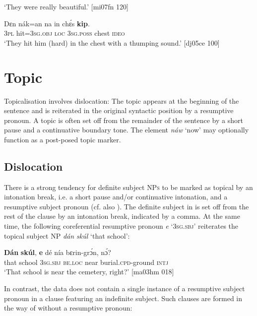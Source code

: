 \glt ‘They were really beautiful.’ [mi07fn 120]
\z


\ea%
    \label{ex:key:747}
    \gll Dɛn  nák=an    na  in    chɛ́s    \textbf{kip}.\\
\textsc{3pl}  hit=\textsc{3sg.obj}  \textsc{loc}  \textsc{3sg.poss}  chest  \textsc{ideo}\\

\glt ‘They hit him (hard) in the chest with a thumping sound.’ [dj05ce 100]
\z

\section{Topic}\label{sec:7.5}

Topicalisation involves dislocation: The topic appears at the beginning of the sentence and is reiterated in the original syntactic position by a resumptive pronoun. A topic is often set off from the remainder of the sentence by a short pause and a continuative boundary tone. The element \textit{náw} ‘now’ may optionally function as a post-posed topic marker.

\subsection{Dislocation}\label{sec:7.5.1}

There is a strong tendency for definite subject \textsc{NPs} to be marked as topical by an intonation break, i.e. a short pause and/or continuative intonation, and a resumptive subject pronoun (cf. also ). The definite subject in  is set off from the rest of the clause by an intonation break, indicated by a comma. At the same time, the following coreferential resumptive pronoun \textit{e} ‘\textsc{3sg.sbj}’ reiterates the topical subject \textsc{NP} \textit{dán skúl} ‘that school’:


\ea%
    \label{ex:key:748}
    \gll \textbf{Dán}    \textbf{skúl},  \textbf{e}    dé    nía    bɛrin-grɔ́n,    nɔ́?\\
that    school  \textsc{3sg.sbj}  \textsc{be.loc}  near    burial.\textsc{cpd}{}-ground  \textsc{intj}\\

\glt ‘That school is near the cemetery, right?’ [ma03hm 018]
\z

In contrast, the data does not contain a single instance of a resumptive subject pronoun in a clause featuring an indefinite subject. Such clauses are formed in the way of  without a resumptive pronoun: 


